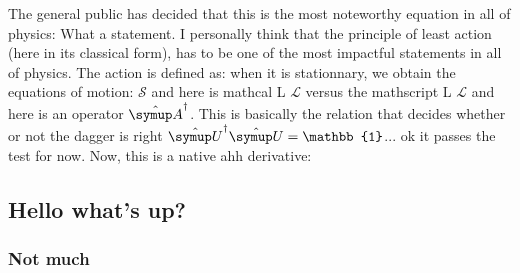 \documentclass[titlepage,oneside,letterpaper,11pt]{article} %
\begin{document}
The general public has decided that this is the most noteworthy equation in all of physics:
What a statement. I personally think that the principle of least action (here in its classical form), has to be one of the most impactful statements in all of physics. The action is defined as:
when it is stationnary, we obtain the equations of motion:
$\mathscr{S}$ and here is mathcal L $\mathcal{L}$ versus the mathscript L $\mathscr{L}$ and here is an operator $\op{A}^\dagger$. This is basically the relation that decides whether or not the dagger is right $\op{U}^\dagger\op{U} = \mathbb{1}$... ok it passes the test for now. Now, this is a native ahh derivative:


\subsection{Hello what's up?}

\subsubsection{Not much}
\end{document}
